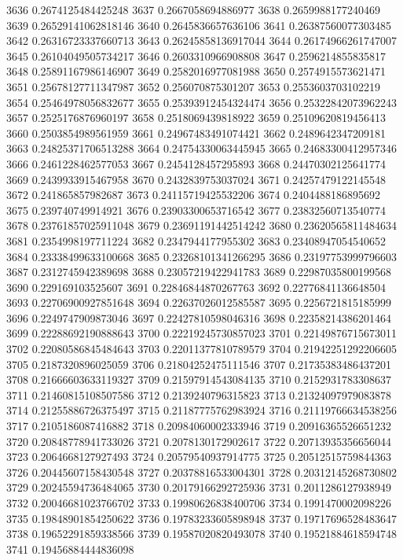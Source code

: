 3636 0.2674125484425248
3637 0.2667058694886977
3638 0.2659988177240469
3639 0.26529141062818146
3640 0.2645836657636106
3641 0.26387560077303485
3642 0.26316723337660713
3643 0.26245858136917044
3644 0.26174966261747007
3645 0.26104049505734217
3646 0.2603310966908808
3647 0.2596214855835817
3648 0.25891167986146907
3649 0.2582016977081988
3650 0.2574915573621471
3651 0.25678127711347987
3652 0.256070875301207
3653 0.2553603703102219
3654 0.25464978056832677
3655 0.25393912454324474
3656 0.25322842073962243
3657 0.2525176876960197
3658 0.2518069439818922
3659 0.25109620819456413
3660 0.2503854989561959
3661 0.24967483491074421
3662 0.2489642347209181
3663 0.24825371706513288
3664 0.24754330063445945
3665 0.24683300412957346
3666 0.2461228462577053
3667 0.2454128457295893
3668 0.24470302125641774
3669 0.2439933915467958
3670 0.2432839753037024
3671 0.24257479122145548
3672 0.241865857982687
3673 0.24115719425532206
3674 0.2404488186895692
3675 0.239740749914921
3676 0.23903300653716542
3677 0.23832560713540774
3678 0.23761857025911048
3679 0.23691191442514242
3680 0.23620565811484634
3681 0.2354998197711224
3682 0.2347944177955302
3683 0.23408947054540652
3684 0.23338499633100668
3685 0.23268101341266295
3686 0.23197753999796603
3687 0.2312745942389698
3688 0.23057219422941783
3689 0.22987035800199568
3690 0.229169103525607
3691 0.22846844870267763
3692 0.22776841136648504
3693 0.22706900927851648
3694 0.22637026012585587
3695 0.2256721815185999
3696 0.2249747909873046
3697 0.22427810598046316
3698 0.22358214386201464
3699 0.22288692190888643
3700 0.22219245730857023
3701 0.22149876715673011
3702 0.22080586845484643
3703 0.22011377810789579
3704 0.21942251292206605
3705 0.2187320896025059
3706 0.21804252475111546
3707 0.21735383486437201
3708 0.21666603633119327
3709 0.21597914543084135
3710 0.2152931783308637
3711 0.21460815108507586
3712 0.2139240796315823
3713 0.21324097979083878
3714 0.21255886726375497
3715 0.21187775762983924
3716 0.21119766634538256
3717 0.2105186087416882
3718 0.20984060002333946
3719 0.20916365526651232
3720 0.20848778941733026
3721 0.2078130172902617
3722 0.20713935356656044
3723 0.2064668127927493
3724 0.20579540937914775
3725 0.20512515759844363
3726 0.20445607158430548
3727 0.20378816533004301
3728 0.20312145268730802
3729 0.20245594736484065
3730 0.20179166292725936
3731 0.2011286127938949
3732 0.20046681023766702
3733 0.19980626838400706
3734 0.1991470002098226
3735 0.19848901854250622
3736 0.19783233605898948
3737 0.19717696528483647
3738 0.19652291859338566
3739 0.19587020820493078
3740 0.19521884618594748
3741 0.19456884444836098
